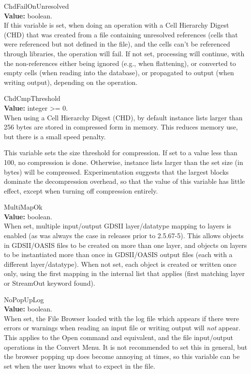 \begin{description}
\item{\et ChdFailOnUnresolved}\\
{\bf Value:} boolean.\\
If this variable is set, when doing an operation with a Cell Hierarchy
Digest (CHD) that was created from a file containing unresolved
references (cells that were referenced but not defined in the file),
and the cells can't be referenced through libraries, the operation
will fail.  If not set, processing will continue, with the
non-references either being ignored (e.g., when flattening), or
converted to empty cells (when reading into the database), or
propagated to output (when writing output), depending on the
operation.

\item{\et ChdCmpThreshold}\\
{\bf Value:} integer {\vt >=} 0.\\
When using a Cell Hierarchy Digest (CHD), by default instance lists
larger than 256 bytes are stored in compressed form in memory.  This
reduces memory use, but there is a small speed penalty.

This variable sets the size threshold for compression.  If set to a
value less than 100, no compression is done.  Otherwise, instance
lists larger than the set size (in bytes) will be compressed. 
Experimentation suggests that the largest blocks dominate the
decompression overhead, so that the value of this variable has little
effect, except when turning off compression entirely.

\item{\et MultiMapOk}\\
{\bf Value:} boolean.\\
When set, multiple input/output GDSII layer/datatype mapping to {\Xic}
layers is enabled (as was always the case in {\Xic} releases prior to
2.5.67-5).  This allows objects in GDSII/OASIS files to be created on
more than one {\Xic} layer, and objects on {\Xic} layers to be
instantiated more than once in GDSII/OASIS output files (each with a
different layer/datatype).  When not set, each object is created or
written once only, using the first mapping in the internal list that
applies (first matching layer or {\et StreamOut} keyword found).

\item{\et NoPopUpLog}\\
{\bf Value:} boolean.\\
When set, the {\cb File Browser} loaded with the log file which
appears if there were errors or warnings when reading an input file or
writing output will {\it not} appear.  This applies to the {\cb Open}
command and equivalent, and the file input/output operations in the
{\cb Convert Menu}.  It is not recommended to set this in general, but
the browser popping up does become annoying at times, so this variable
can be set when the user knows what to expect in the file.


\end{description}
